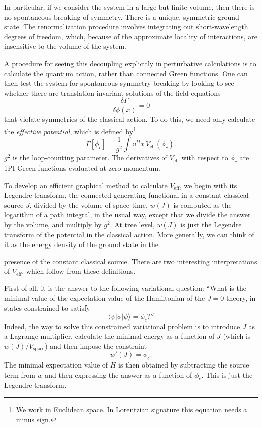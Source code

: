 In particular, if we consider the system in a large but finite volume, then
there is no spontaneous breaking of symmetry. There is a unique, symmetric
ground state. The renormalization procedure involves integrating out
short-wavelength degrees of freedom, which, because of the approximate locality
of interactions, are insensitive to the volume of the system.

A procedure for seeing this decoupling explicitly in perturbative calculations
is to calculate the quantum action, rather than connected Green functions. One
can then test the system for spontaneous symmetry breaking by looking to see
whether there are translation-invariant solutions of the field equations
\[
  \frac{\delta\Gamma}{\delta\phi(x)}=0
\]
that violate symmetries of the classical action. To do this, we need only
calculate the \emph{effective potential}, which is defined by\footnote[20]{We
work in Euclidean space. In Lorentzian signature this equation needs a minus
sign.}
\[
  \Gamma[\phi_c]=\frac{1}{g^2}\int\dd^D x\,V_{\mathrm{eff}}(\phi_c).
\]
$g^2$ is the loop-counting parameter. The derivatives of $V_{\mathrm{eff}}$
with respect to $\phi_c$ are 1PI Green functions evaluated at zero momentum.

To develop an efficient graphical method to calculate $V_{\mathrm{eff}}$, we
begin with its Legendre transform, the connected generating functional in a
constant classical source $J$, divided by the volume of space-time. $w(J)$ is
computed as the logarithm of a path integral, in the usual way, except that we
divide the answer by the volume, and multiply by $g^2$. At tree level, $w(J)$
is just the Legendre transform of the potential in the classical action. More
generally, we can think of it as the energy density of the ground state in the

presence of the constant classical source. There are two interesting
interpretations of $V_{\mathrm{eff}}$, which follow from these definitions.

First of all, it is the answer to the following variational question: ``What is
the minimal value of the expectation value of the Hamiltonian of the $J=0$
theory, in states constrained to satisfy
\[
  \langle\psi|\phi|\psi\rangle=\phi_c?''
\]
Indeed, the way to solve this constrained variational problem is to introduce
$J$ as a Lagrange multiplier, calculate the minimal energy as a function of $J$
(which is $w(J)/V_{\mathrm{space}}$) and then impose the constraint
\[
  w'(J)=\phi_c.
\]
The minimal expectation value of $H$ is then obtained by subtracting the
source term from $w$ and then expressing the answer as a function of $\phi_c$.
This is just the Legendre transform.

